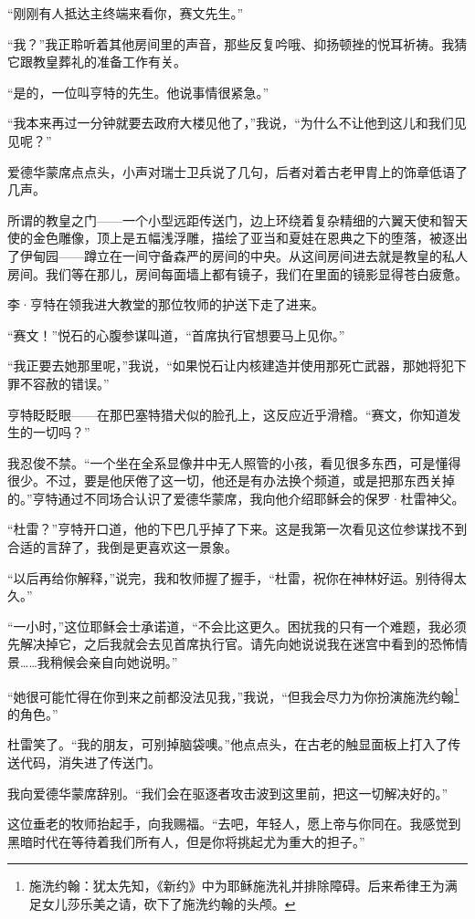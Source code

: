 \documentclass[AutoFakeBold=true]{book}
\begin{document}
``刚刚有人抵达主终端来看你，赛文先生。''

``我？''我正聆听着其他房间里的声音，那些反复吟哦、抑扬顿挫的悦耳祈祷。我猜它跟教皇葬礼的准备工作有关。

``是的，一位叫亨特的先生。他说事情很紧急。''

``我本来再过一分钟就要去政府大楼见他了，''我说，``为什么不让他到这儿和我们见见呢？''

爱德华蒙席点点头，小声对瑞士卫兵说了几句，后者对着古老甲胄上的饰章低语了几声。

所谓的教皇之门——一个小型远距传送门，边上环绕着复杂精细的六翼天使和智天使的金色雕像，顶上是五幅浅浮雕，描绘了亚当和夏娃在恩典之下的堕落，被逐出了伊甸园——蹲立在一间守备森严的房间的中央。从这间房间进去就是教皇的私人房间。我们等在那儿，房间每面墙上都有镜子，我们在里面的镜影显得苍白疲惫。

李·亨特在领我进大教堂的那位牧师的护送下走了进来。

``赛文！''悦石的心腹参谋叫道，``首席执行官想要马上见你。''

``我正要去她那里呢，''我说，``如果悦石让内核建造并使用那死亡武器，那她将犯下罪不容赦的错误。''

亨特眨眨眼——在那巴塞特猎犬似的脸孔上，这反应近乎滑稽。``赛文，你知道发生的一切吗？''

我忍俊不禁。``一个坐在全系显像井中无人照管的小孩，看见很多东西，可是懂得很少。不过，要是他厌倦了这一切，他还是有办法换个频道，或是把那东西关掉的。''亨特通过不同场合认识了爱德华蒙席，我向他介绍耶稣会的保罗·杜雷神父。

``杜雷？''亨特开口道，他的下巴几乎掉了下来。这是我第一次看见这位参谋找不到合适的言辞了，我倒是更喜欢这一景象。

``以后再给你解释，''说完，我和牧师握了握手，``杜雷，祝你在神林好运。别待得太久。''

``一小时，''这位耶稣会士承诺道，``不会比这更久。困扰我的只有一个难题，我必须先解决掉它，之后我就会去见首席执行官。请先向她说说我在迷宫中看到的恐怖情景……我稍候会亲自向她说明。''

``她很可能忙得在你到来之前都没法见我，''我说，``但我会尽力为你扮演施洗约翰\footnote{施洗约翰：犹太先知，《新约》中为耶稣施洗礼并排除障碍。后来希律王为满足女儿莎乐美之请，砍下了施洗约翰的头颅。}的角色。''

杜雷笑了。``我的朋友，可别掉脑袋噢。''他点点头，在古老的触显面板上打入了传送代码，消失进了传送门。

我向爱德华蒙席辞别。``我们会在驱逐者攻击波到这里前，把这一切解决好的。''

这位垂老的牧师抬起手，向我赐福。``去吧，年轻人，愿上帝与你同在。我感觉到黑暗时代在等待着我们所有人，但是你将挑起尤为重大的担子。''
\end{document}
